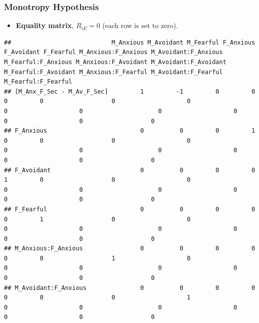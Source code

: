 \documentclass[
]{book}
\providecommand{\tightlist}{%
  \setlength{\itemsep}{0pt}\setlength{\parskip}{0pt}}
\begin{document}
\hypertarget{monotropy-hypothesis}{%
\subsubsection*{Monotropy Hypothesis}\label{monotropy-hypothesis}}

\begin{itemize}
\tightlist
\item
  \textbf{Equality matrix}, \(R_{iE} = 0\) (each row is set to zero).
\end{itemize}

\begin{verbatim}
##                            M_Anxious M_Avoidant M_Fearful F_Anxious F_Avoidant F_Fearful M_Anxious:F_Anxious M_Avoidant:F_Anxious M_Fearful:F_Anxious M_Anxious:F_Avoidant M_Avoidant:F_Avoidant M_Fearful:F_Avoidant M_Anxious:F_Fearful M_Avoidant:F_Fearful M_Fearful:F_Fearful
## [M_Anx_F_Sec - M_Av_F_Sec]         1         -1         0         0          0         0                   0                    0                   0                    0                     0                    0                   0                    0                   0
## F_Anxious                          0          0         0         1          0         0                   0                    0                   0                    0                     0                    0                   0                    0                   0
## F_Avoidant                         0          0         0         0          1         0                   0                    0                   0                    0                     0                    0                   0                    0                   0
## F_Fearful                          0          0         0         0          0         1                   0                    0                   0                    0                     0                    0                   0                    0                   0
## M_Anxious:F_Anxious                0          0         0         0          0         0                   1                    0                   0                    0                     0                    0                   0                    0                   0
## M_Avoidant:F_Anxious               0          0         0         0          0         0                   0                    1                   0                    0                     0                    0                   0                    0                   0

\end{verbatim}
\end{document}
